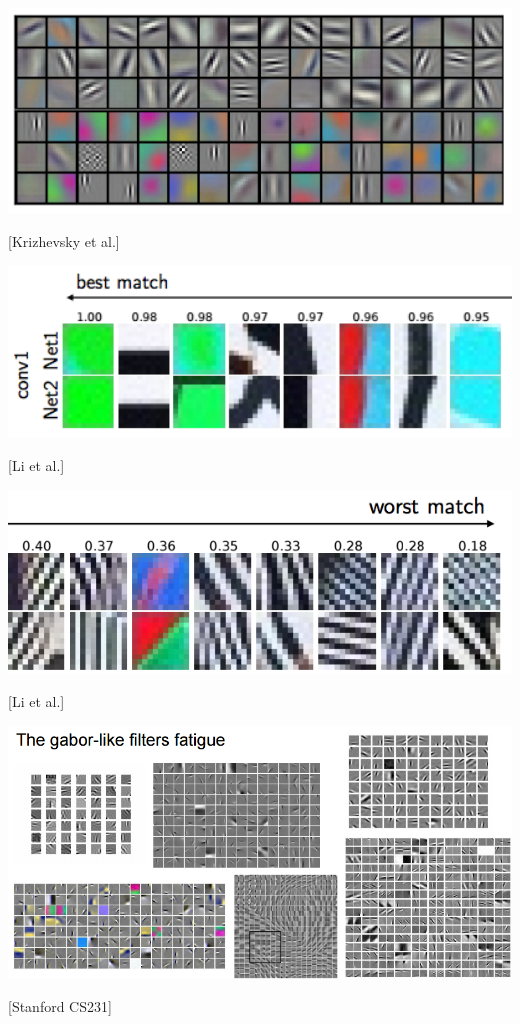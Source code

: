 {

\centerline{\includegraphics[width = 9.5in]{../images/AlexnetL1}}
\centerline{[Krizhevsky et al.]}


\centerline{\includegraphics[width = 8in]{../images/Correlations2}}
\centerline{[Li et al.]}


\centerline{\includegraphics[width = 8in]{../images/Correlations3}}
\centerline{[Li et al.]}


\centerline{\includegraphics[width = 9.5in]{../images/Filters}}
\centerline{[Stanford CS231]}

}

